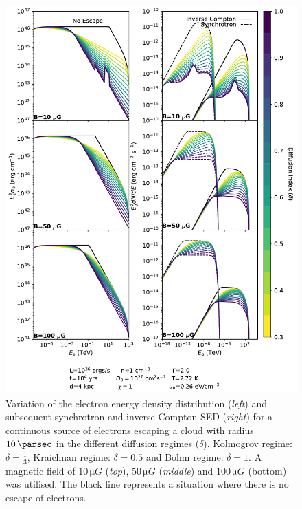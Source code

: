 \begin{figure}[hbtp]
    \centering
    \includegraphics[width=1.0\textwidth]{07_Particle_Evolution/Images/Code/diffusion_regimes_continuous.pdf}
    \caption{Variation of the electron energy density distribution (\textit{left}) and subsequent synchrotron and inverse Compton SED (\textit{right}) for a continuous source of electrons escaping a cloud with radius $10\,\pc$ in the different diffusion regimes ($\delta$). Kolmogrov regime: $\delta=\frac{1}{3}$, Kraichnan regime: $\delta=0.5$ and Bohm regime: $\delta=1$. A magnetic field of $10\,\si{\micro G}$ (\textit{top}), $50\,\si{\micro G}$ (\textit{middle}) and $100\,\si{\micro G}$ (bottom) was utilised. The black line represents a situation where there is no escape of electrons.}
    \label{fig:chapter_7_newsedprod_diffusion_regimes_continuous}
\end{figure}

